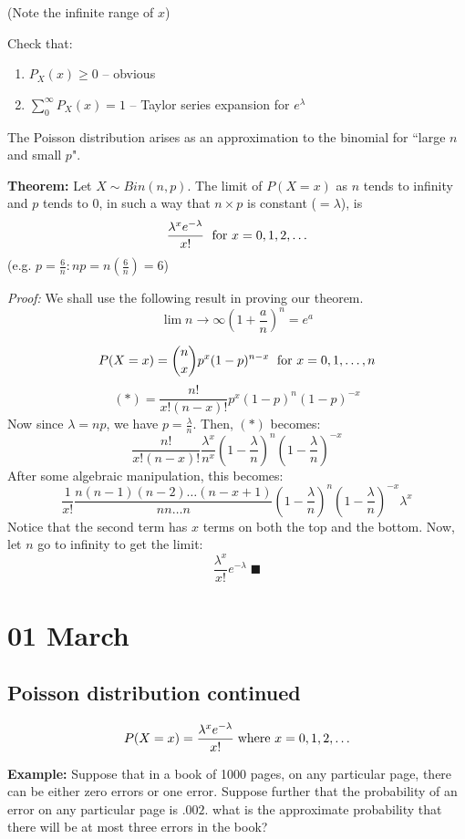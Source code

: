 \documentclass[12pt]{article}
\begin{document}
(Note the infinite range of $x$)

Check that:
\begin{enumerate}
    \item $P_X (x) \geq 0$ -- obvious
    \item $\sum_0^{\infty} P_X (x) = 1$ -- Taylor series expansion for $e^{\lambda}$
\end{enumerate}

The Poisson distribution arises as an approximation to the binomial for ``large $n$ and small $p$".

\textbf{Theorem:} Let $X \sim Bin(n,p)$. The limit of $P(X=x)$ as $n$ tends to infinity and $p$ tends to 0, in such a way that $n \times p$ is constant ($ = \lambda$), is
\[
    \frac{ \lambda^x e^{- \lambda}}{x!} \; \textnormal{ for } x = 0,1,2,\ldots
\]
(e.g. $p = \frac{6}{n} : np = n(\frac{6}{n}) = 6$)

\emph{Proof:} We shall use the following result in proving our theorem.
\[
    \lim{n \to \infty} (1 + \frac{a}{n})^n = e^a
\]

\[
    P(X = x) = {n \choose x} p^x (1-p)^{n-x} \; \textnormal{ for } x = 0,1,\ldots,n
\]
\[
    (*) = \frac{n!}{x! (n-x)!} p^x (1-p)^n (1-p)^{-x}
\]
Now since $\lambda = np$, we have $p = \frac{\lambda}{n}$. Then, $(*)$ becomes:
\[
    \frac{n!}{x! (n-x)!} \frac{\lambda^x}{n^x} (1 - \frac{\lambda}{n})^n (1 - \frac{\lambda}{n})^{-x}
\]
After some algebraic manipulation, this becomes:
\[
    \frac{1}{x!} \frac{n (n-1) (n-2) \ldots (n-x+1)}{n n \ldots n} (1 - \frac{\lambda}{n})^n (1 - \frac{\lambda}{n})^{-x} \lambda^x
\]
Notice that the second term has $x$ terms on both the top and the bottom. Now, let $n$ go to infinity to get the limit:
\[
    \frac{\lambda^x}{x!} e^{- \lambda} \; \blacksquare
\]

\section{01 March}
\subsection{Poisson distribution continued}
\[
    P(X = x) = \frac{\lambda^x e^{- \lambda}}{x!} \; \textnormal{where } x = 0, 1, 2, \ldots
\]

\textbf{Example:} Suppose that in a book of 1000 pages, on any particular page, there can be either zero errors or one error. Suppose further that the probability of an error on any particular page is $.002$. what is the approximate probability that there will be at most three errors in the book?
\end{document}
